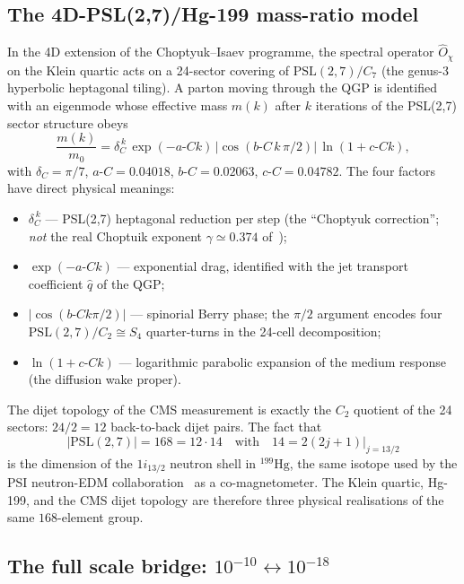 \documentclass[11pt,a4paper]{article}
\newcommand{\dC}{\delta_C}
\newcommand{\aC}{a\text{-}C}
\newcommand{\bC}{b\text{-}C}
\newcommand{\cC}{c\text{-}C}
\newcommand{\PSL}{\mathrm{PSL}}
\theoremstyle{plain}
\theoremstyle{definition}
\theoremstyle{remark}
\begin{document}
\subsection{The 4D-PSL(2,7)/Hg-199 mass-ratio model}
\label{sec:mass-model}

In the 4D extension of the Choptyuk--Isaev programme, the spectral
operator $\hat{O}_\chi$ on the Klein quartic acts on a 24-sector
covering of $\PSL(2,7)/C_7$ (the genus-3 hyperbolic heptagonal
tiling).  A parton moving through the QGP is identified with an
eigenmode whose effective mass $m(k)$ after $k$ iterations of the
PSL(2,7) sector structure obeys
\begin{equation}
\label{eq:mass-ratio}
\frac{m(k)}{m_0}
= \dC^{\,k}\,\exp(-\aC k)\,\bigl|\cos(\bC\,k\,\pi/2)\bigr|\,
  \ln(1+\cC k),
\end{equation}
with $\dC = \pi/7$, $\aC = 0.04018$, $\bC = 0.02063$, $\cC = 0.04782$.
The four factors have direct physical meanings:
\begin{itemize}[leftmargin=2em,itemsep=2pt]
  \item $\dC^{\,k}$ --- PSL(2,7) heptagonal reduction per step (the
        ``Choptyuk correction''; \emph{not} the real Choptuik exponent
        $\gamma \simeq 0.374$ of~\cite{choptyuk1993});
  \item $\exp(-\aC k)$ --- exponential drag, identified with the jet
        transport coefficient $\hat{q}$ of the QGP;
  \item $|\cos(\bC k \pi/2)|$ --- spinorial Berry phase; the
        $\pi/2$ argument encodes four $\PSL(2,7)/C_2 \cong S_4$
        quarter-turns in the 24-cell decomposition;
  \item $\ln(1+\cC k)$ --- logarithmic parabolic expansion of the
        medium response (the diffusion wake proper).
\end{itemize}
The dijet topology of the CMS measurement is exactly the $C_2$
quotient of the 24 sectors: $24/2 = 12$ back-to-back dijet pairs.  The
fact that
\[
|\PSL(2,7)| = 168 = 12 \cdot 14
\quad\text{with}\quad
14 = 2(2j+1)\big|_{j=13/2}
\]
is the dimension of the $1i_{13/2}$ neutron shell in ${}^{199}\mathrm{Hg}$,
the same isotope used by the PSI neutron-EDM
collaboration~\cite{abishevPSI2024} as a co-magnetometer.  The Klein
quartic, Hg-199, and the CMS dijet topology are therefore three
physical realisations of the same $168$-element group.

\subsection{The full scale bridge: $10^{-10} \leftrightarrow 10^{-18}$}
\label{sec:scale-bridge}
\end{document}
